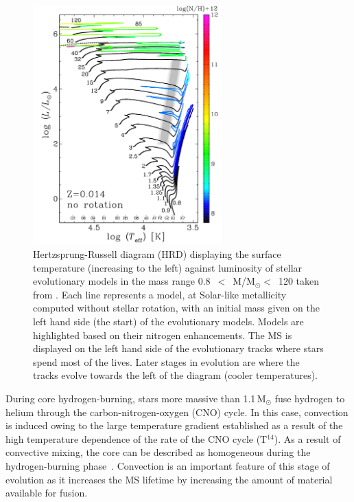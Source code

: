 {\begin{figure}
 \centering
 \includegraphics[width=0.65\textwidth]{intro/HRD}
 \caption[Hertzsprung-Russell diagram (HRD) of stars]{
Hertzsprung-Russell diagram (HRD) displaying the surface temperature (increasing to the left) against luminosity of stellar evolutionary models in the mass range
0.8~$<$~M/M$_{\odot}<$~120 taken from
\protect\citet{2012A&A...537A.146E}.
Each line represents a model, at Solar-like metallicity computed without stellar rotation, with an initial mass given on the left hand side (the start) of the evolutionary models.
Models are highlighted based on their nitrogen enhancements.
The MS is displayed on the left hand side of the evolutionary tracks where stars spend most of the lives.
Later stages in evolution are where the tracks evolve towards the left of the diagram (cooler temperatures).
 \label{fig:HRD}}
\end{figure}


During core hydrogen-burning, stars more massive than 1.1\,M$_{\odot}$ fuse hydrogen to helium through the carbon-nitrogen-oxygen (CNO) cycle.
In this case, convection is induced owing to the large temperature gradient established as a result of the high temperature dependence of the rate of the CNO cycle (T$^{14}$).
As a result of convective mixing, the core can be described as homogeneous during the hydrogen-burning phase~\citep{2012sse..book.....K}.
Convection is an important feature of this stage of evolution as it increases the MS lifetime by increasing the amount of material available for fusion.

}
